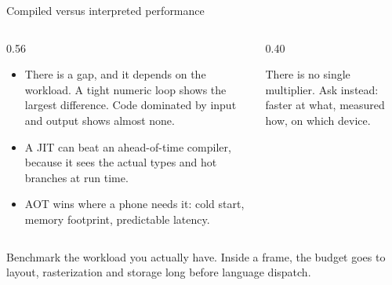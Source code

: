 \documentclass[10pt,aspectratio=169,t]{beamer}
\begin{document}
\begin{frame}[eyebrow=How code runs]{Compiled versus interpreted performance}
  \vskip 2mm
  \begin{columns}[T]
    \begin{column}{0.56\textwidth}
      \begin{itemize}
        \item There is a gap, and it depends on the workload. A tight numeric loop shows the largest difference. Code dominated by input and output shows almost none.
        \item A JIT can beat an ahead-of-time compiler, because it sees the actual types and hot branches at run time.
        \item AOT wins where a phone needs it: cold start, memory footprint, predictable latency.
      \end{itemize}
    \end{column}
    \begin{column}{0.40\textwidth}
      \begin{warning}
         There is no single multiplier. Ask instead: faster at what, measured how, on which device.
      \end{warning}
    \end{column}
  \end{columns}
  \begin{takeaway}{Benchmark the workload you actually have.}
    Inside a frame, the budget goes to layout, rasterization and storage long before language dispatch.
  \end{takeaway}
\end{frame}
\end{document}
